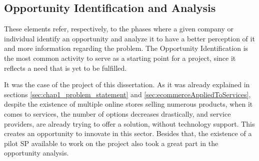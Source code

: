 \subsection{Opportunity Identification and Analysis}
These elements refer, respectively, to the phases where a given company or individual identify an opportunity and analyze it to have a better perception of it and more information regarding the problem. The Opportunity Identification is the most common activity to serve as a starting point for a project, since it reflects a need that is yet to be fulfilled.
\par
It was the case of the project of this dissertation.  As it was already explained in sections \ref{sec:chap1_problem_statement} and \ref{sec:ecommerceAppliedToServices}, despite the existence of multiple online stores selling numerous products, when it comes to services, the number of options decreases drastically, and service providers, are already trying to offer a solution, without technology support. This creates an opportunity to innovate in this sector. Besides that, the existence of a pilot \gls{SP} available to work on the project also took a great part in the opportunity analysis.

